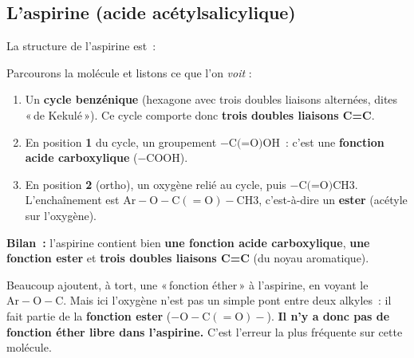 \documentclass[11pt,a4paper]{article}
\begin{document}
\subsection{L'aspirine (acide acétylsalicylique)}
\begin{exemple}
La structure de l'aspirine est~:
\begin{center}\end{center}

Parcourons la molécule et listons ce que l'on \emph{voit} :
\begin{enumerate}[leftmargin=1.6em,itemsep=1pt]
  \item Un \textbf{cycle benzénique} (hexagone avec trois doubles liaisons alternées, dites «\,de Kekulé\,»). Ce cycle comporte donc \textbf{trois doubles liaisons C=C}.
  \item En position \textbf{1} du cycle, un groupement $-\text{C(=O)OH}$~: c'est une \textbf{fonction acide carboxylique} ($-\text{COOH}$).
  \item En position \textbf{2} (ortho), un oxygène relié au cycle, puis $-\text{C(=O)CH3}$. L'enchaînement est $\mathrm{Ar-O-C(=O)-CH3}$, c'est-à-dire un \textbf{ester} (acétyle sur l'oxygène).
\end{enumerate}

\textbf{Bilan~:} l'aspirine contient bien \textbf{une fonction acide carboxylique}, \textbf{une fonction ester} et \textbf{trois doubles liaisons C=C} (du noyau aromatique).

\begin{attention}
Beaucoup ajoutent, à tort, une «\,fonction éther\,» à l'aspirine, en voyant le $\mathrm{Ar-O-C}$. Mais ici l'oxygène n'est pas un simple pont entre deux alkyles~: il fait partie de la \textbf{fonction ester} ($\mathrm{-O-C(=O)-}$). \textbf{Il n'y a donc pas de fonction éther libre dans l'aspirine.} C'est l'erreur la plus fréquente sur cette molécule.
\end{attention}
\end{exemple}

\end{document}
